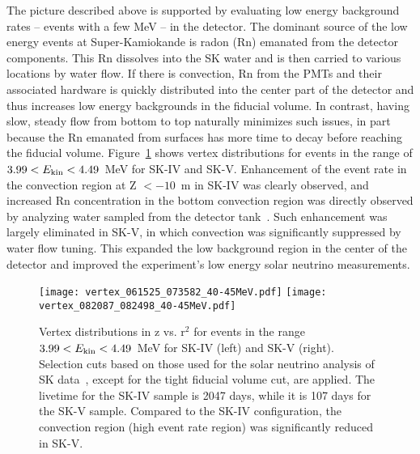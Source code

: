 \documentclass[preprint,12pt]{elsarticle}
\begin{document}
The picture described above is supported by evaluating low energy background rates -- events with a few MeV -- in the detector. The dominant source of the low energy events at Super-Kamiokande is radon (Rn) emanated from the detector components. 
This Rn dissolves into the SK water and is then carried to various locations by water flow.
If there is convection, Rn from the PMTs and their associated hardware is quickly distributed 
into the center part of the detector and thus increases low energy
backgrounds in the fiducial volume.  In contrast, having slow, steady flow from bottom to top
naturally minimizes such issues, in part because the Rn emanated from surfaces has more time to decay before reaching the fiducial volume.
Figure~\ref{fig:lowe_vertex} shows vertex distributions for events in the range of 
$3.99 < E_{\rm{kin}} < 4.49$~MeV for SK-IV and SK-V. 
Enhancement of the event rate in the convection region at Z $< -10$~m in SK-IV was clearly observed, and  
increased Rn concentration in the bottom convection region was directly observed by 
analyzing water sampled from the detector tank~\cite{Nakano:2019bnr}.
Such enhancement was largely eliminated in SK-V, in which convection was significantly suppressed by water flow tuning. This expanded the low background region in the center of the 
detector and improved the experiment's low energy solar neutrino measurements.

\begin{figure}[htb]
\begin{center}
\texttt{[image: vertex\_061525\_073582\_40-45MeV.pdf]}
\texttt{[image: vertex\_082087\_082498\_40-45MeV.pdf]}
\caption{Vertex distributions in z vs. r$^2$ for events in the range $3.99 < E_{\rm{kin}} < 4.49$~MeV
  for SK-IV (left) and SK-V (right).
  Selection cuts based on those used for the solar neutrino analysis of SK data~\cite{Abe:2016nxk}, except for the tight fiducial volume cut, are applied. 
  The livetime for the SK-IV sample is  2047 days, 
  while it is 107 days for the SK-V sample.
  Compared to the SK-IV configuration, the convection region (high event rate region) was significantly reduced in SK-V.
}
\label{fig:lowe_vertex}
\end{center}
\end{figure}
\end{document}
